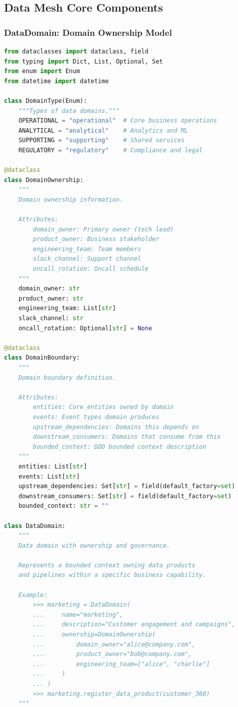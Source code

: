 \subsection{Data Mesh Core Components}

\subsubsection{DataDomain: Domain Ownership Model}

\begin{lstlisting}[language=Python, caption={Data Domain with Ownership and Governance}]
from dataclasses import dataclass, field
from typing import Dict, List, Optional, Set
from enum import Enum
from datetime import datetime

class DomainType(Enum):
    """Types of data domains."""
    OPERATIONAL = "operational"  # Core business operations
    ANALYTICAL = "analytical"    # Analytics and ML
    SUPPORTING = "supporting"    # Shared services
    REGULATORY = "regulatory"    # Compliance and legal

@dataclass
class DomainOwnership:
    """
    Domain ownership information.

    Attributes:
        domain_owner: Primary owner (tech lead)
        product_owner: Business stakeholder
        engineering_team: Team members
        slack_channel: Support channel
        oncall_rotation: Oncall schedule
    """
    domain_owner: str
    product_owner: str
    engineering_team: List[str]
    slack_channel: str
    oncall_rotation: Optional[str] = None

@dataclass
class DomainBoundary:
    """
    Domain boundary definition.

    Attributes:
        entities: Core entities owned by domain
        events: Event types domain produces
        upstream_dependencies: Domains this depends on
        downstream_consumers: Domains that consume from this
        bounded_context: DDD bounded context description
    """
    entities: List[str]
    events: List[str]
    upstream_dependencies: Set[str] = field(default_factory=set)
    downstream_consumers: Set[str] = field(default_factory=set)
    bounded_context: str = ""

class DataDomain:
    """
    Data domain with ownership and governance.

    Represents a bounded context owning data products
    and pipelines within a specific business capability.

    Example:
        >>> marketing = DataDomain(
        ...     name="marketing",
        ...     description="Customer engagement and campaigns",
        ...     ownership=DomainOwnership(
        ...         domain_owner="alice@company.com",
        ...         product_owner="bob@company.com",
        ...         engineering_team=["alice", "charlie"]
        ...     )
        ... )
        >>> marketing.register_data_product(customer_360)
    """


\end{lstlisting}
